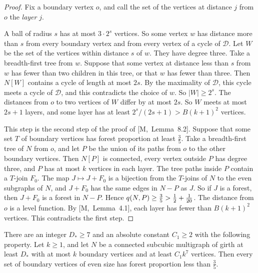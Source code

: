 \documentclass[11pt]{article}
\newcommand{\M}[1]{[M,~#1]}
\begin{document}
\begin{proof}
Fix a boundary vertex $o$, and call the set of the vertices at distance $j$ from $o$ the
\emph{layer} $j$.

 A ball of radius $s$ has at most $3\cdot2^{s}$ vertices. So some vertex $w$
has distance more than $s$ from every boundary vertex and from every vertex of a cycle of
$\mathcal D$. Let $W$ be the set of the vertices within distance $s$ of $w$. They have degree
three. Take a breadth-first tree from $w$. Suppose that some vertex at distance less than $s$
from $w$ has fewer than two children in this tree, or that $w$ has fewer than three. Then
$N[W]$ contains a cycle of length at most $2s$. By the maximality of $\mathcal D$, this cycle
meets a cycle of $\mathcal D$, and this contradicts the choice of $w$. So $|W|\ge2^{s}$. The
distances from $o$ to two vertices of $W$ differ by at most
$2s$. So $W$ meets at most $2s+1$ layers, and some layer has at least
$2^{s}/(2s+1)>B(k+1)^{2}$ vertices.

 This step is the second step of the proof of \M{Lemma~8.2}. Suppose that some
set $T$ of boundary vertices has forest proportion at least $\frac35$. Take a breadth-first tree
of $N$ from $o$, and let $P$ be the union of its paths from $o$ to the other boundary vertices.
Then $N[P]$ is connected, every vertex outside $P$ has degree three, and $P$ has at most $k$
vertices in each layer. The tree paths inside $P$ contain a $T$-join $F_0$. The map
$J\mapsto J+F_0$ is a bijection from the $T$-joins of $N$ to the even subgraphs of $N$, and
$J+F_0$ has the same edges in $N-P$ as $J$. So if $J$ is a forest, then $J+F_0$ is a forest in
$N-P$. Hence $q(N,P)\ge\frac35>\tfrac12+\frac1{20}$. The distance from $o$ is a level function. By
\M{Lemma~4.1}, each layer has fewer than $B(k+1)^{2}$ vertices. This contradicts the first step.
\end{proof}

\begin{theorem}\label{thm:pieces}
There are an integer $D_*\ge7$ and an absolute constant $C_1\ge2$ with the following property. Let
$k\ge1$, and let $N$ be a connected subcubic multigraph of girth at least $D_*$ with at most $k$
boundary vertices and at least $C_1k^{7}$ vertices. Then every set of boundary vertices of even
size has forest proportion less than $\frac35$.
\end{theorem}
\end{document}
